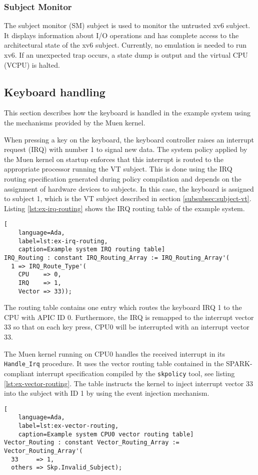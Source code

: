 \subsubsection{Subject Monitor}
The subject monitor (SM) subject is used to monitor the untrusted xv6
subject. It displays information about I/O operations and has complete access to
the architectural state of the xv6 subject. Currently, no emulation is needed to
run xv6. If an unexpected trap occurs, a state dump is output and the virtual
CPU (VCPU) is halted.

\subsection{Keyboard handling}\label{subsec:keyboard-handling}
This section describes how the keyboard is handled in the example system using
the mechanisms provided by the Muen kernel.

When pressing a key on the keyboard, the keyboard controller raises an interrupt
request (IRQ) with number 1 to signal new data. The system policy
applied by the Muen kernel on startup enforces that this interrupt is routed to
the appropriate processor running the VT subject. This is done using the IRQ
routing specification generated during policy compilation and depends on the
assignment of hardware devices to subjects. In this case, the keyboard is
assigned to subject 1, which is the VT subject described in section
\ref{subsubsec:subject-vt}. Listing \ref{lst:ex-irq-routing} shows the IRQ
routing table of the example system.

\begin{lstlisting}[
	language=Ada,
	label=lst:ex-irq-routing,
	caption=Example system IRQ routing table]
IRQ_Routing : constant IRQ_Routing_Array := IRQ_Routing_Array'(
  1 => IRQ_Route_Type'(
    CPU    => 0,
    IRQ    => 1,
    Vector => 33));
\end{lstlisting}

The routing table contains one entry which routes the keyboard IRQ 1 to the CPU
with APIC ID 0. Furthermore, the IRQ is remapped to the interrupt vector 33 so
that on each key press, CPU0 will be interrupted with an interrupt vector 33.

The Muen kernel running on CPU0 handles the received interrupt in its
\texttt{Handle\_Irq} procedure. It uses the vector routing table contained in
the SPARK-compliant interrupt specification compiled by the \texttt{skpolicy}
tool, see listing \ref{lst:ex-vector-routing}. The table instructs the kernel to
inject interrupt vector 33 into the subject with ID 1 by using the event
injection mechanism.
\begin{lstlisting}[
	language=Ada,
	label=lst:ex-vector-routing,
	caption=Example system CPU0 vector routing table]
Vector_Routing : constant Vector_Routing_Array := Vector_Routing_Array'(
  33     => 1,
  others => Skp.Invalid_Subject);
\end{lstlisting}

